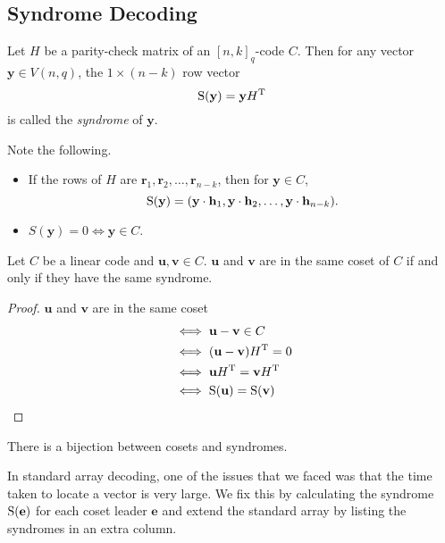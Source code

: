 \subsection{Syndrome Decoding}

\begin{definition}
    Let $H$ be a parity-check matrix of an $[n,k]_q$-code $C$. Then for any vector $\textbf{y}\in V(n,q)$, the $1\times(n-k)$ row vector
    $$\operatorname{S}(\textbf{y})=\textbf{y}H^\text{T}$$
    is called the \textit{syndrome} of $\textbf{y}$.
\end{definition}

Note the following.
\begin{itemize}
    \item If the rows of $H$ are $\textbf{r}_1,\textbf{r}_2,\ldots,\textbf{r}_{n-k}$, then for $\textbf{y}\in C$,
    $$\operatorname{S}(\textbf{y})=(\textbf{y}\cdot\textbf{h}_1,\textbf{y}\cdot\textbf{h}_2,\ldots,\textbf{y}\cdot\textbf{h}_{n-k}).$$
    \item $S(\textbf{y})=0\iff \textbf{y}\in C$.
\end{itemize}

\begin{lemma}
    Let $C$ be a linear code and $\textbf{u}, \textbf{v}\in C$. $\textbf{u}$ and $\textbf{v}$ are in the same coset of $C$ if and only if they have the same syndrome.
\end{lemma}
\begin{proof}
   $\textbf{u}$ and $\textbf{v}$ are in the same coset
   \begin{align*}
       &\iff \textbf{u}-\textbf{v}\in C \\
       &\iff (\textbf{u}-\textbf{v})H^\text{T}=0 \\
       &\iff \textbf{u}H^\text{T}=\textbf{v}H^\text{T} \\
       &\iff \operatorname{S}(\textbf{u})=\operatorname{S}(\textbf{v})
   \end{align*}
\end{proof}

\begin{corollary}
    There is a bijection between cosets and syndromes.
\end{corollary}

In standard array decoding, one of the issues that we faced was that the time taken to locate a vector is very large. We fix this by calculating the syndrome $\operatorname{S}(\textbf{e})$ for each coset leader $\textbf{e}$ and extend the standard array by listing the syndromes in an extra column.

